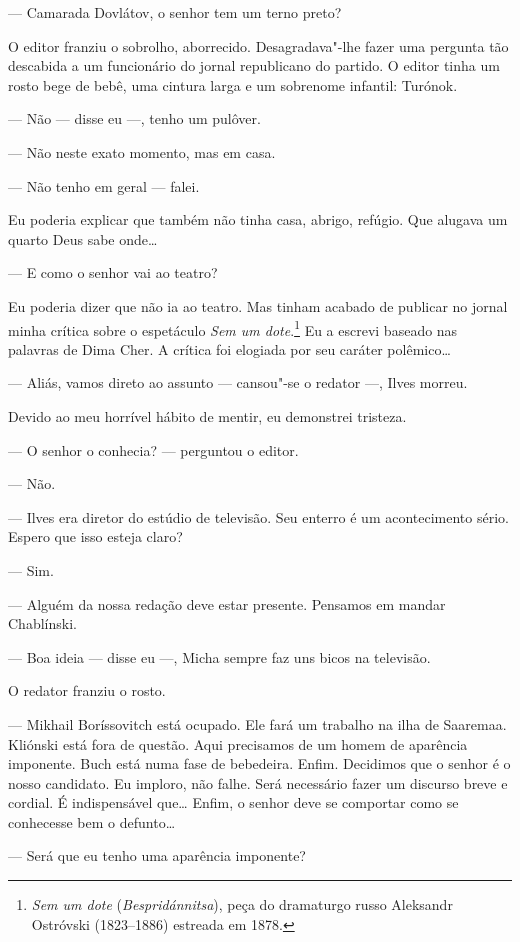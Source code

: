 --- Camarada Dovlátov, o senhor tem um terno preto?

O editor franziu o sobrolho, aborrecido. Desagradava"-lhe fazer uma
pergunta tão descabida a um funcionário do jornal republicano do
partido. O editor tinha um rosto bege de bebê, uma cintura larga e um
sobrenome infantil: Turónok.

--- Não --- disse eu ---, tenho um pulôver.

--- Não neste exato momento, mas em casa.

--- Não tenho em geral --- falei.

Eu poderia explicar que também não tinha casa, abrigo, refúgio. Que
alugava um quarto Deus sabe onde\ldots{}

--- E como o senhor vai ao teatro?

Eu poderia dizer que não ia ao teatro. Mas tinham acabado de publicar no
jornal minha crítica sobre o espetáculo \emph{Sem um dote}.\footnote{\emph{Sem
  um dote} (\emph{Bespridánnitsa}), peça do dramaturgo russo Aleksandr
  Ostróvski (1823--1886) estreada em 1878.} Eu a escrevi baseado nas
palavras de Dima Cher. A crítica foi elogiada por seu caráter
polêmico\ldots{}

--- Aliás, vamos direto ao assunto --- cansou"-se o redator ---, Ilves
morreu.

Devido ao meu horrível hábito de mentir, eu demonstrei tristeza.

--- O senhor o conhecia? --- perguntou o editor.

--- Não.

--- Ilves era diretor do estúdio de televisão. Seu enterro é um
acontecimento sério. Espero que isso esteja claro?

--- Sim.

--- Alguém da nossa redação deve estar presente. Pensamos em mandar
Chablínski.

--- Boa ideia --- disse eu ---, Micha sempre faz uns bicos na televisão.

O redator franziu o rosto.

--- Mikhail Boríssovitch está ocupado. Ele fará um trabalho na ilha de
Saaremaa. Kliónski está fora de questão. Aqui precisamos de um homem de
aparência imponente. Buch está numa fase de bebedeira. Enfim. Decidimos
que o senhor é o nosso candidato. Eu imploro, não falhe. Será necessário
fazer um discurso breve e cordial. É indispensável que\ldots{} Enfim, o
senhor deve se comportar como se conhecesse bem o defunto\ldots{}

--- Será que eu tenho uma aparência imponente?

